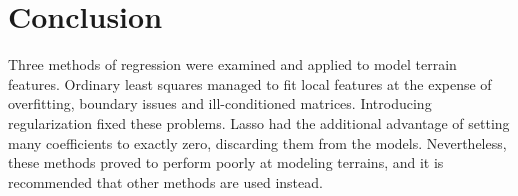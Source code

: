 \begin{minipage}{\columnwidth}
\section{Conclusion}\label{sec:Conclusion}
Three methods of regression were examined and applied to model terrain features.
Ordinary least squares managed to fit local features at the expense of
overfitting, boundary issues and ill-conditioned matrices. Introducing
regularization fixed these problems. Lasso had the additional advantage of
setting many coefficients to exactly zero, discarding them from the models.
Nevertheless, these methods proved to perform poorly at modeling terrains, and
it is recommended that other methods are used instead. 


\end{minipage}